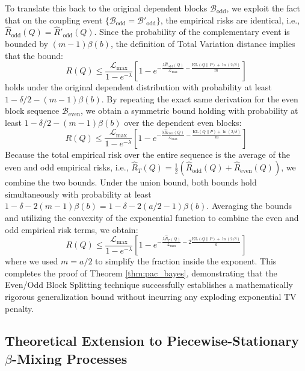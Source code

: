 To translate this back to the original dependent blocks $\mathcal{B}_{\text{odd}}$, we exploit the fact that on the coupling event $\{\mathcal{B}_{\text{odd}} = \mathcal{B}'_{\text{odd}}\}$, the empirical risks are identical, i.e., $\hat{R}_{\text{odd}}(Q) = \hat{R}'_{\text{odd}}(Q)$. Since the probability of the complementary event is bounded by $(m - 1) \beta(b)$, the definition of Total Variation distance implies that the bound:
\begin{equation}
    R(Q) \le \frac{\mathcal{L}_{\max}}{1 - e^{-\lambda}} \left[ 1 - e^{-\frac{\lambda \hat{R}_{\text{odd}}(Q)}{\mathcal{L}_{\max}} - \frac{\text{KL}(Q \| P) + \ln(2/\delta)}{m}} \right]
\end{equation}
holds under the original dependent distribution with probability at least $1 - \delta/2 - (m-1)\beta(b)$.
By repeating the exact same derivation for the even block sequence $\mathcal{B}_{\text{even}}$, we obtain a symmetric bound holding with probability at least $1 - \delta/2 - (m-1)\beta(b)$ over the dependent even blocks:
\begin{equation}
    R(Q) \le \frac{\mathcal{L}_{\max}}{1 - e^{-\lambda}} \left[ 1 - e^{-\frac{\lambda \hat{R}_{\text{even}}(Q)}{\mathcal{L}_{\max}} - \frac{\text{KL}(Q \| P) + \ln(2/\delta)}{m}} \right]
\end{equation}
Because the total empirical risk over the entire sequence is the average of the even and odd empirical risks, i.e., $\hat{R}_{T}(Q) = \frac{1}{2} (\hat{R}_{\text{odd}}(Q) + \hat{R}_{\text{even}}(Q))$, we combine the two bounds. Under the union bound, both bounds hold simultaneously with probability at least $1 - \delta - 2(m-1)\beta(b) = 1 - \delta - 2(a/2 - 1)\beta(b)$. Averaging the bounds and utilizing the convexity of the exponential function to combine the even and odd empirical risk terms, we obtain:
\begin{equation}
    R(Q) \le \frac{\mathcal{L}_{\max}}{1 - e^{-\lambda}} \left[ 1 - e^{ -\frac{\lambda \hat{R}_T(Q)}{\mathcal{L}_{\max}} - 2 \frac{\text{KL}(Q \| P) + \ln(2/\delta)}{a} } \right]
\end{equation}
where we used $m = a/2$ to simplify the fraction inside the exponent. This completes the proof of Theorem \ref{thm:pac_bayes}, demonstrating that the Even/Odd Block Splitting technique successfully establishes a mathematically rigorous generalization bound without incurring any exploding exponential TV penalty.

\subsection{Theoretical Extension to Piecewise-Stationary $\beta$-Mixing Processes}
\label{sec:appendix_piecewise}

